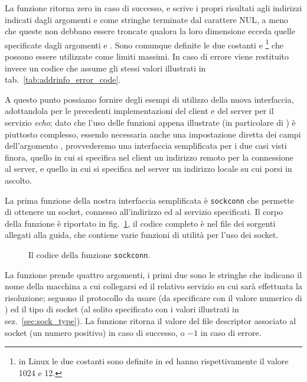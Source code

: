 La funzione ritorna zero in caso di successo, e scrive i propri risultati agli
indirizzi indicati dagli argomenti  e  come stringhe
terminate dal carattere NUL, a meno che queste non debbano essere troncate
qualora la loro dimensione ecceda quelle specificate dagli argomenti
 e . Sono comunque definite le due costanti
 e \footnote{in Linux le due costanti
  sono definite in  ed hanno rispettivamente il valore 1024
  e 12.}  che possono essere utilizzate come limiti massimi.  In caso di
errore viene restituito invece un codice che assume gli stessi valori
illustrati in tab.~\ref{tab:addrinfo_error_code}.

A questo punto possiamo fornire degli esempi di utilizzo della nuova
interfaccia, adottandola per le precedenti implementazioni del client e del
server per il servizio \textit{echo}; dato che l'uso delle funzioni appena
illustrate (in particolare di ) è piuttosto complesso,
essendo necessaria anche una impostazione diretta dei campi dell'argomento
, provvederemo una interfaccia semplificata per i due casi visti
finora, quello in cui si specifica nel client un indirizzo remoto per la
connessione al server, e quello in cui si specifica nel server un indirizzo
locale su cui porsi in ascolto.

La prima funzione della nostra interfaccia semplificata è \texttt{sockconn}
che permette di ottenere un socket, connesso all'indirizzo ed al servizio
specificati. Il corpo della funzione è riportato in
fig.~\ref{fig:sockconn_code}, il codice completo è nel file 
dei sorgenti allegati alla guida, che contiene varie funzioni di utilità per
l'uso dei socket.

\begin{figure}[!htb]
  \footnotesize \centering
  \begin{minipage}[c]{\codesamplewidth}
  \end{minipage}
  \normalsize
  \caption{Il codice della funzione \texttt{sockconn}.}
  \label{fig:sockconn_code}
\end{figure}

La funzione prende quattro argomenti, i primi due sono le stringhe che
indicano il nome della macchina a cui collegarsi ed il relativo servizio su
cui sarà effettuata la risoluzione; seguono il protocollo da usare (da
specificare con il valore numerico di ) ed il tipo di
socket (al solito specificato con i valori illustrati in
sez.~\ref{sec:sock_type}).  La funzione ritorna il valore del file descriptor
associato al socket (un numero positivo) in caso di successo, o $-1$ in caso
di errore.

